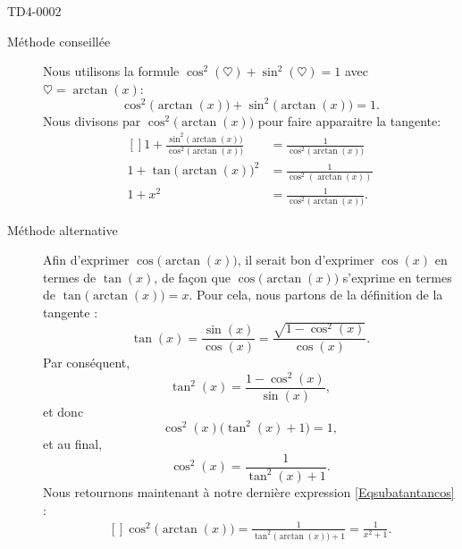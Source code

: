\begin{corrige}{TD4-0002}
\begin{enumerate}
            \begin{description}
                \item[Méthode conseillée] 
                        Nous utilisons la formule \( \cos^2(\heartsuit)+\sin^2(\heartsuit)=1\) avec \( \heartsuit=\arctan(x)\):
                        \begin{equation}
                            \cos^2\big( \arctan(x) \big)+\sin^2\big( \arctan(x) \big)=1.
                        \end{equation}
                        Nous divisons par \( \cos^2\big( \arctan(x) \big)\) pour faire apparaitre la tangente:
                        \begin{equation}
                            \begin{aligned}[]
                                1+\frac{ \sin^2\big( \arctan(x) \big) }{  \cos^2\big( \arctan(x) \big)  }&=\frac{1}{  \cos^2\big( \arctan(x) \big)  }\\
                                1+\tan\big( \arctan(x) \big)^2&=\frac{1}{ \cos^2(\arctan(x)) }\\
                                1+x^2&=\frac{1}{ \cos^2\big( \arctan(x) \big) }.
                            \end{aligned}
                        \end{equation}
                        
                \item[Méthode alternative]

            Afin d'exprimer \( \cos\big( \arctan(x) \big)\),  il serait bon d'exprimer $\cos(x)$ en termes de $\tan(x)$, de façon que $\cos\big( \arctan(x) \big)$ s'exprime en termes de $\tan\big( \arctan(x) \big)=x$. Pour cela, nous partons de la définition de la tangente :
			\begin{equation}
				\tan(x)=\frac{ \sin(x) }{ \cos(x) }=\frac{ \sqrt{1-\cos^2(x)} }{ \cos(x) }.
			\end{equation}
			Par conséquent,
			\begin{equation}
				\tan^2(x)=\frac{ 1-\cos^2(x) }{ \sin(x) },
			\end{equation}
			et donc
			\begin{equation}
				\cos^2(x)\big( \tan^2(x)+1 \big)=1,
			\end{equation}
			et au final,
			\begin{equation}
				\cos^2(x)=\frac{1}{ \tan^2(x)+1 }.
			\end{equation}
			Nous retournons maintenant à notre dernière expression \eqref{Eqsubatantancos} :
			\begin{equation}
				\begin{aligned}[]
					\cos^2\big( \arctan(x) \big)=\frac{1}{ \tan^2\big( \arctan(x) \big)+1 }=\frac{1}{ x^2+1 }.
				\end{aligned}
			\end{equation}


\end{description}
\end{enumerate}
\end{corrige}
